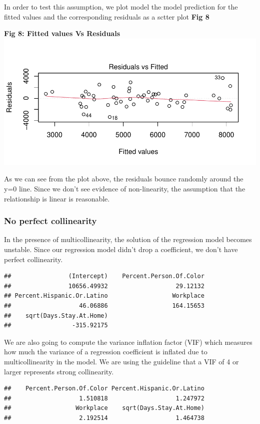 \documentclass[
]{article}
\begin{document}
In order to test this assumption, we plot model the model prediction for
the fitted values and the corresponding residuals as a sctter plot
\textbf{Fig 8}

\textbf{Fig 8: Fitted values Vs Residuals}\\
\includegraphics{Final_Report_files/figure-latex/lce-1.pdf}

As we can see from the plot above, the residuals bounce randomly around
the y=0 line. Since we don't see evidence of non-linearity, the
assumption that the relationship is linear is reasonable.

\hypertarget{no-perfect-collinearity}{%
\subsubsection{No perfect collinearity}\label{no-perfect-collinearity}}

In the presence of multicollinearity, the solution of the regression
model becomes unstable. Since our regression model didn't drop a
coefficient, we don't have perfect collinearity.

\begin{verbatim}
##                (Intercept)    Percent.Person.Of.Color 
##                10656.49932                   29.12132 
## Percent.Hispanic.Or.Latino                  Workplace 
##                   46.06886                  164.15653 
##    sqrt(Days.Stay.At.Home) 
##                 -315.92175
\end{verbatim}

We are also going to compute the variance inflation factor (VIF) which
measures how much the variance of a regression coefficient is inflated
due to multicollinearity in the model. We are using the guideline that a
VIF of 4 or larger represents strong collinearity.

\begin{verbatim}
##    Percent.Person.Of.Color Percent.Hispanic.Or.Latino 
##                   1.510818                   1.247972 
##                  Workplace    sqrt(Days.Stay.At.Home) 
##                   2.192514                   1.464738
\end{verbatim}
\end{document}
